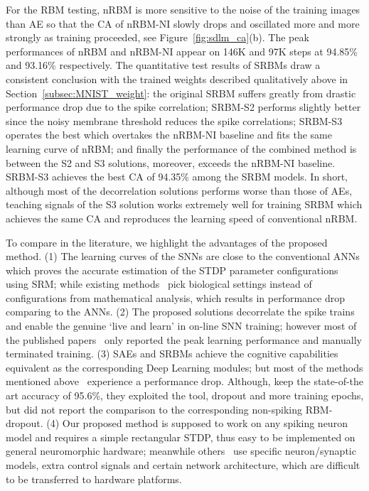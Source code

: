 For the RBM testing, nRBM is more sensitive to the noise of the training images than AE so that the CA of nRBM-NI slowly drops and oscillated more and more strongly as training proceeded, see Figure~\ref{fig:sdlm_ca}(b).
The peak performances of nRBM and nRBM-NI appear on 146K and 97K steps at 94.85\% and 93.16\% respectively. 
The quantitative test results of SRBMs draw a consistent conclusion with the trained weights described qualitatively above in Section~\ref{subsec:MNIST_weight}: the original SRBM suffers greatly from drastic performance drop due to the spike correlation; SRBM-S2 performs slightly better since the noisy membrane threshold reduces the spike correlations; SRBM-S3 operates the best which overtakes the nRBM-NI baseline and fits the same learning curve of nRBM; and finally the performance of the combined method is between the S2 and S3 solutions, moreover, exceeds the nRBM-NI baseline.
SRBM-S3 achieves the best CA of 94.35\% among the SRBM models.
In short, although most of the decorrelation solutions performs worse than those of AEs, teaching signals of the S3 solution works extremely well for training SRBM which achieves the same CA and reproduces the learning speed of conventional nRBM.

To compare in the literature, we highlight the advantages of the proposed method.
(1) The learning curves of the SNNs are close to the conventional ANNs which proves the accurate estimation of the STDP parameter configurations using SRM;
while existing methods~\citep{neil2013online,neftci2013event} pick biological settings instead of configurations from mathematical analysis, which results in performance drop comparing to the ANNs.
(2) The proposed solutions decorrelate the spike trains and enable the genuine `live and learn' in on-line SNN training;
however most of the published papers~\citep{neftci2013event,neftci2016stochastic} only reported the peak learning performance and manually terminated training. 
(3) SAEs and SRBMs achieve the cognitive capabilities equivalent as the corresponding Deep Learning modules;
but most of the methods mentioned above~\citep{neil2013online,neftci2013event} experience a performance drop.
Although, \citet{neftci2016stochastic} keep the state-of-the art accuracy of 95.6\%, they exploited the \DIFdelbegin {}\DIFdelend \DIFaddbegin {}\DIFaddend tool, dropout and more training epochs, but did not report the comparison to the corresponding non-spiking RBM-dropout.
(4) Our proposed method is supposed to work on any spiking neuron model and requires a simple rectangular STDP, thus easy to be implemented on general neuromorphic hardware;
meanwhile others~\citep{neftci2013event,neftci2016stochastic} use specific neuron/synaptic models, extra control signals and certain network architecture, which are difficult to be transferred to hardware platforms.


